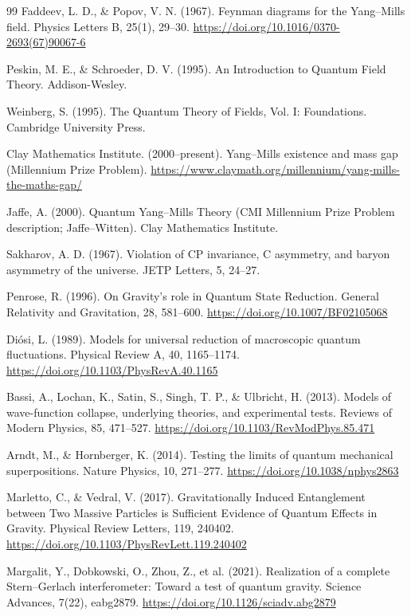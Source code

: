 \documentclass[12pt,a4paper]{article}
\begin{document}
\begin{thebibliography}{99}
		Faddeev, L. D., \& Popov, V. N. (1967). Feynman diagrams for the Yang–Mills field. Physics Letters B, 25(1), 29–30. \url{https://doi.org/10.1016/0370-2693(67)90067-6}
		
		Peskin, M. E., \& Schroeder, D. V. (1995). An Introduction to Quantum Field Theory. Addison-Wesley.
		
		Weinberg, S. (1995). The Quantum Theory of Fields, Vol. I: Foundations. Cambridge University Press.
		
		Clay Mathematics Institute. (2000–present). Yang–Mills existence and mass gap (Millennium Prize Problem). \url{https://www.claymath.org/millennium/yang-mills-the-maths-gap/}
		
		Jaffe, A. (2000). Quantum Yang–Mills Theory (CMI Millennium Prize Problem description; Jaffe–Witten). Clay Mathematics Institute.
		
		Sakharov, A. D. (1967). Violation of CP invariance, C asymmetry, and baryon asymmetry of the universe. JETP Letters, 5, 24–27.
		
		Penrose, R. (1996). On Gravity’s role in Quantum State Reduction. General Relativity and Gravitation, 28, 581–600. \url{https://doi.org/10.1007/BF02105068}
		
		Diósi, L. (1989). Models for universal reduction of macroscopic quantum fluctuations. Physical Review A, 40, 1165–1174. \url{https://doi.org/10.1103/PhysRevA.40.1165}
		
		Bassi, A., Lochan, K., Satin, S., Singh, T. P., \& Ulbricht, H. (2013). Models of wave-function collapse, underlying theories, and experimental tests. Reviews of Modern Physics, 85, 471–527. \url{https://doi.org/10.1103/RevModPhys.85.471}
		
		Arndt, M., \& Hornberger, K. (2014). Testing the limits of quantum mechanical superpositions. Nature Physics, 10, 271–277. \url{https://doi.org/10.1038/nphys2863}
		
		Marletto, C., \& Vedral, V. (2017). Gravitationally Induced Entanglement between Two Massive Particles is Sufficient Evidence of Quantum Effects in Gravity. Physical Review Letters, 119, 240402. \url{https://doi.org/10.1103/PhysRevLett.119.240402}
		
		Margalit, Y., Dobkowski, O., Zhou, Z., et al. (2021). Realization of a complete Stern–Gerlach interferometer: Toward a test of quantum gravity. Science Advances, 7(22), eabg2879. \url{https://doi.org/10.1126/sciadv.abg2879}
		

\end{thebibliography}
\end{document}
